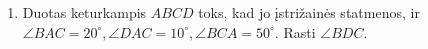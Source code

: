 \begin{enumerate}
\item Duotas keturkampis $ABCD$ toks, kad jo įstrižainės statmenos,
ir $\angle BAC=20^\circ,\angle DAC=10^\circ, \angle BCA=50^\circ$.
Rasti $\angle BDC$.

\end{enumerate}

